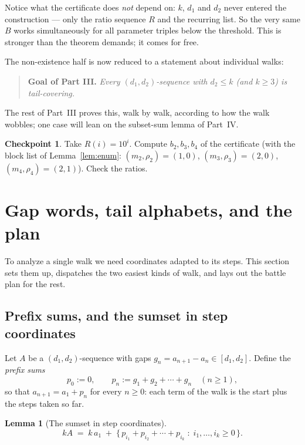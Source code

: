 \documentclass[11pt,reqno]{amsart}
\theoremstyle{plain}
\newtheorem{lemma}[theorem]{Lemma}
\theoremstyle{definition}
\newtheorem{checkpoint}[theorem]{Checkpoint}   %
\theoremstyle{remark}
\begin{document}
Notice what the certificate does \emph{not} depend on: $k$, $d_1$ and $d_2$ never
entered the construction --- only the ratio sequence $R$ and the recurring list. So
the very same $B$ works simultaneously for all parameter triples below the threshold.
This is stronger than the theorem demands; it comes for free.

The non-existence half is now reduced to a statement about individual walks:

\begin{quote}
\textbf{Goal of Part III.} \emph{Every $(d_1,d_2)$-sequence with $d_2 \le k$
(and $k \ge 3$) is tail-covering.}
\end{quote}

The rest of Part~III proves this, walk by walk, according to how the walk wobbles;
one case will lean on the subset-sum lemma of Part~IV.

\begin{checkpoint}
Take $R(i) = 10^i$. Compute $b_2, b_3, b_4$ of the certificate (with the block list
of Lemma~\ref{lem:enum}: $(m_2,\rho_2) = (1,0)$, $(m_3,\rho_3) = (2,0)$,
$(m_4,\rho_4) = (2,1)$). Check the ratios.
\end{checkpoint}


\section{Gap words, tail alphabets, and the plan}\label{sec:alphabet}

To analyze a single walk we need coordinates adapted to its steps. This section sets
them up, dispatches the two easiest kinds of walk, and lays out the battle plan for
the rest.

\subsection{Prefix sums, and the sumset in step coordinates}

Let $A$ be a $(d_1,d_2)$-sequence with gaps $g_n = a_{n+1} - a_n \in [d_1, d_2]$.
Define the \emph{prefix sums}
\[
  p_0 := 0, \qquad p_n := g_1 + g_2 + \cdots + g_n \quad (n \ge 1) ,
\]
so that $a_{n+1} = a_1 + p_n$ for every $n \ge 0$: each term of the walk is the
start plus the steps taken so far.

\begin{lemma}[The sumset in step coordinates]\label{lem:kA-prefix}
\[
  kA \;=\; k\,a_1 \;+\; \{\, p_{i_1} + p_{i_2} + \cdots + p_{i_k} \;:\;
           i_1, \dots, i_k \ge 0 \,\} .
\]
\end{lemma}
\end{document}
